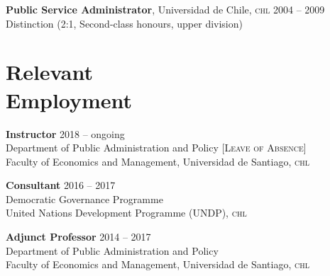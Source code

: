 \documentclass[letterpaper,margin]{res}
\begin{document}
\begin{resume}
{\small {\bfseries Public Service Administrator}, Universidad de Chile, {\scshape chl}}  \hfill {\small 2004 -- 2009}\\
{\small Distinction (2:1, Second-class honours, upper division)}


 \section{\footnotesize Relevant \\ Employment}
 
{\bf \small Instructor} \hfill {\small 2018 -- ongoing}\\
{\small Department of Public Administration and Policy} \hfill {\scshape \footnotesize [Leave of Absence]}\\
{\small Faculty of Economics and Management, Universidad de Santiago, {\scshape chl}}


{\bf \small Consultant} \hfill {\small 2016 -- 2017}\\
{\small Democratic Governance Programme}\\
{\small United Nations Development Programme ({\scshape UNDP}), {\scshape chl}}

{\small \bf Adjunct Professor} \hfill {\small 2014 -- 2017}\\
{\small Department of Public Administration and Policy}\\
{\small Faculty of Economics and Management, Universidad de Santiago, {\scshape chl}}



\end{resume}
\end{document}
